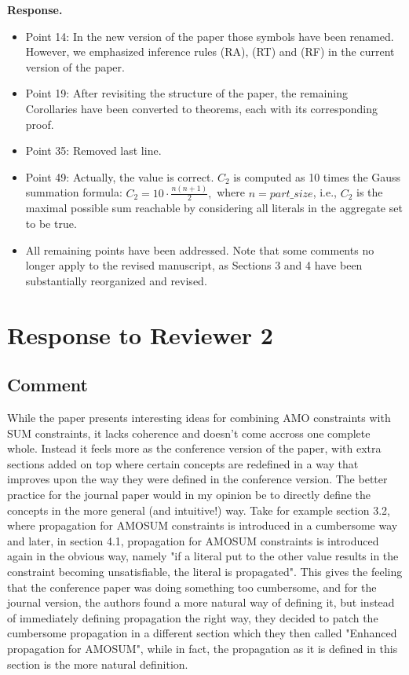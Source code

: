 \documentclass[11pt]{article}
\theoremstyle{definition}
\newcommand{\revieweranswered}{\subsection{Comment}}
\newenvironment{response}{
    \color{blue} \textbf{Response.}
}{
}
\begin{document}
\begin{response}
    \begin{itemize}
        \item Point 14: In the new version of the paper those symbols have been renamed.
    However, we emphasized inference rules (RA), (RT) and (RF) in the current version of the paper.
        \item Point 19: After revisiting the structure of the paper, the remaining Corollaries have been converted to theorems, each with its corresponding proof.
        \item Point 35: Removed last line.
         \item Point 49: Actually, the value is correct. $C_2$ is computed as 10 times the Gauss summation formula: $C_2 = 10 \cdot \frac{n(n+1)}{2},$ where $n = \textit{part\_size}$, i.e., $C_2$ is the maximal possible sum reachable by considering all literals in the aggregate set to be true.
    \item All remaining points have been addressed. Note that some comments no longer apply to the revised manuscript, as Sections 3 and 4 have been substantially reorganized and revised.
    \end{itemize}
\end{response}

\section{Response to Reviewer 2}

\vspace{0.5cm}
\revieweranswered
While the paper presents interesting ideas for combining AMO constraints with SUM constraints, it lacks coherence and doesn't come accross one complete whole.
Instead it feels more as the conference version of the paper, with extra sections added on top where certain concepts are redefined in a way that improves upon the way they were defined in the conference version. The better practice for the journal paper would in my opinion be to directly define the concepts in the more general (and intuitive!) way.
Take for example section 3.2, where propagation for AMOSUM constraints is introduced in a cumbersome way and later, in section 4.1, propagation for AMOSUM constraints is introduced again in the obvious way, namely "if a literal put to the other value results in the constraint becoming unsatisfiable, the literal is propagated". This gives the feeling that the conference paper was doing something too cumbersome, and for the journal version, the authors found a more natural way of defining it, but instead of immediately defining propagation the right way, they decided to patch the cumbersome propagation in a different section which they then called "Enhanced propagation for AMOSUM", while in fact, the propagation as it is defined in this section is the more natural definition.
\end{document}
